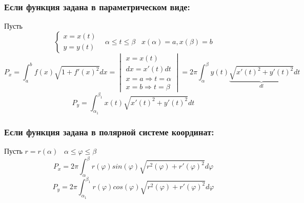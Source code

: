 \documentclass[12pt]{article}
\begin{document}
    \subsubsection*{Если функция задана в параметрическом виде:}
    Пусть 
    \[ \begin{cases}
        x=x(t)\\
        y=y(t)
    \end{cases} \;\;\; \alpha \leq t \leq \beta \;\;\; x(\alpha)=a, x(\beta)=b \]
    \[ P_x=\int_{a}^{b}f(x)\sqrt{1+f'(x)^2}dx=\begin{vmatrix}
        x=x(t)\\
        dx=x'(t)dt\\
        x=a \Rightarrow t=\alpha\\
        x=b \Rightarrow t=\beta
    \end{vmatrix}=\boxed{2\pi \int_{\alpha}^{\beta}y(t) \underbrace{\sqrt{x'(t)^2+y'(t)^2}}_{dl}dt} \]
    \[ \boxed{P_y=\int_{\alpha_1}^{\beta_1}x(t)\sqrt{x'(t)^2+y'(t)^2}dt} \]
    \subsubsection*{Если функция задана в полярной системе координат:}
    Пусть $r=r(\alpha) \;\;\; \alpha \leq \varphi \leq \beta$
    \[ \boxed{P_x=2\pi \int_{\alpha}^{\beta}r(\varphi)sin(\varphi)\sqrt{r^2(\varphi)+r'(\varphi)^2}d\varphi} \]
    \[ \boxed{P_y=2\pi \int_{\alpha_1}^{\beta_1}r(\varphi)cos(\varphi)\sqrt{r^2(\varphi)+r'(\varphi)^2}d\varphi} \]
\end{document}
